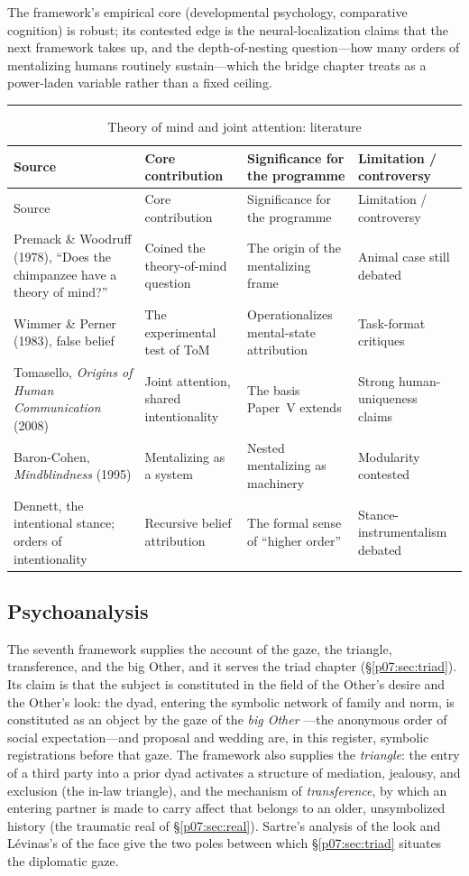 \documentclass[11pt,a4paper]{article}
\newcommand{\goldrule}{\noindent\textcolor{gold}{\rule{\linewidth}{0.6pt}}\par\vspace{0.4em}}
\newcommand{\xref}[1]{\textcolor{rose}{\S\ref{#1}}}
\newcommand{\pinkref}[1]{\textcolor{rose}{#1}}
\begin{document}
The framework's empirical core (developmental psychology, comparative cognition) is robust; its contested edge is the neural-localization claims that the next framework takes up, and the depth-of-nesting question---how many orders of mentalizing humans routinely sustain---which the bridge chapter treats as a power-laden variable rather than a fixed ceiling.

\goldrule
\footnotesize
\begin{longtable}{Y Y Y Y}
\caption{Theory of mind and joint attention: literature}\label{p07:tab:lit-tom}\\
\toprule
{}
Source & Core contribution & Significance for the programme & Limitation / controversy \\
\midrule
\endfirsthead
{}
Source & Core contribution & Significance for the programme & Limitation / controversy \\
\midrule
\endhead
Premack \& Woodruff (1978), ``Does the chimpanzee have a theory of mind?'' & Coined the theory-of-mind question & The origin of the mentalizing frame & Animal case still debated \\
Wimmer \& Perner (1983), false belief & The experimental test of ToM & Operationalizes mental-state attribution & Task-format critiques \\
Tomasello, \emph{Origins of Human Communication} (2008) & Joint attention, shared intentionality & The basis \pinkref{Paper~V} extends & Strong human-uniqueness claims \\
Baron-Cohen, \emph{Mindblindness} (1995) & Mentalizing as a system & Nested mentalizing as machinery & Modularity contested \\
Dennett, the intentional stance; orders of intentionality & Recursive belief attribution & The formal sense of ``higher order'' & Stance-instrumentalism debated \\
\bottomrule
\end{longtable}

\subsection{Psychoanalysis}
The seventh framework supplies the account of the gaze, the triangle, transference, and the big Other, and it serves the triad chapter (\xref{p07:sec:triad}). Its claim is that the subject is constituted in the field of the Other's desire and the Other's look: the dyad, entering the symbolic network of family and norm, is constituted as an object by the gaze of the \emph{big Other} \parencite{lacan1964sem11}---the anonymous order of social expectation---and proposal and wedding are, in this register, symbolic registrations before that gaze. The framework also supplies the \emph{triangle}: the entry of a third party into a prior dyad activates a structure of mediation, jealousy, and exclusion (the in-law triangle), and the mechanism of \emph{transference}, by which an entering partner is made to carry affect that belongs to an older, unsymbolized history (the traumatic real of \xref{p07:sec:real}). Sartre's analysis of the look \parencite{sartre1943} and Lévinas's of the face \parencite{levinas1961} give the two poles between which \xref{p07:sec:triad} situates the diplomatic gaze.
\end{document}

